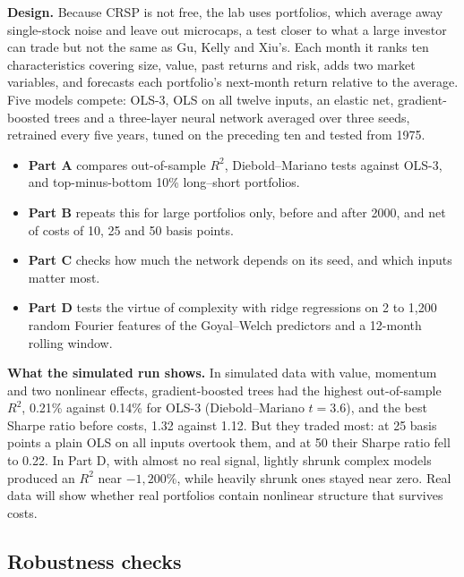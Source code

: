 \textbf{Design.} Because CRSP is not free, the lab uses portfolios, which average away single-stock noise and leave out microcaps, a test closer to what a large investor can trade but not the same as Gu, Kelly and Xiu's. Each month it ranks ten characteristics covering size, value, past returns and risk, adds two market variables, and forecasts each portfolio's next-month return relative to the average. Five models compete: OLS-3, OLS on all twelve inputs, an elastic net, gradient-boosted trees and a three-layer neural network averaged over three seeds, retrained every five years, tuned on the preceding ten and tested from 1975.

\begin{itemize}
  \item \textbf{Part A} compares out-of-sample $R^2$, Diebold--Mariano tests against OLS-3, and top-minus-bottom 10\% long--short portfolios.
  \item \textbf{Part B} repeats this for large portfolios only, before and after 2000, and net of costs of 10, 25 and 50 basis points.
  \item \textbf{Part C} checks how much the network depends on its seed, and which inputs matter most.
  \item \textbf{Part D} tests the virtue of complexity with ridge regressions on 2 to 1,200 random Fourier features of the Goyal--Welch predictors and a 12-month rolling window.
\end{itemize}

\textbf{What the simulated run shows.} In simulated data with value, momentum and two nonlinear effects, gradient-boosted trees had the highest out-of-sample $R^2$, 0.21\% against 0.14\% for OLS-3 (Diebold--Mariano $t = 3.6$), and the best Sharpe ratio before costs, 1.32 against 1.12. But they traded most: at 25 basis points a plain OLS on all inputs overtook them, and at 50 their Sharpe ratio fell to 0.22. In Part D, with almost no real signal, lightly shrunk complex models produced an $R^2$ near $-1{,}200\%$, while heavily shrunk ones stayed near zero. Real data will show whether real portfolios contain nonlinear structure that survives costs.

\subsection{Robustness checks}
\label{sec:20-stress}

